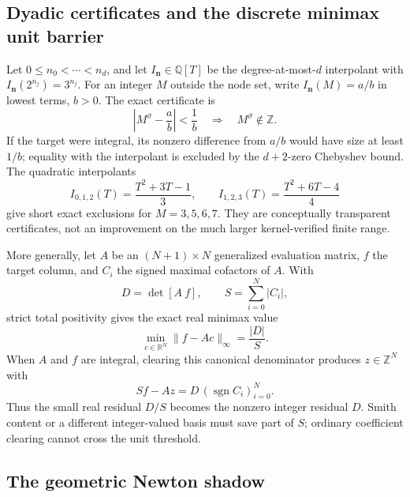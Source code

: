 \documentclass[11pt,oneside]{article}
\theoremstyle{definition}
\theoremstyle{remark}
\newcommand{\Z}{\mathbb Z}
\newcommand{\Q}{\mathbb Q}
\newcommand{\R}{\mathbb R}
\newcommand{\thetaq}{\vartheta}
\begin{document}
\subsection{Dyadic certificates and the discrete minimax unit barrier}
\label{arithinterp:certificates}

Let $0\le n_0<\cdots<n_d$, and let $I_{\mathbf n}\in\Q[T]$ be the degree-at-most-$d$
interpolant with $I_{\mathbf n}(2^{n_j})=3^{n_j}$.  For an integer $M$ outside the node set,
write $I_{\mathbf n}(M)=a/b$ in lowest terms, $b>0$.  The exact certificate is
\begin{equation}
 \left|M^{\thetaq}-\frac ab\right|<\frac1b
 \quad\Longrightarrow\quad M^{\thetaq}\notin\Z.
 \label{arithinterp:eq-dyadic-certificate}
\end{equation}
If the target were integral, its nonzero difference from $a/b$ would have size at least
$1/b$; equality with the interpolant is excluded by the $d+2$-zero Chebyshev bound.  The
quadratic interpolants
\begin{equation}
 I_{0,1,2}(T)=\frac{T^2+3T-1}{3},\qquad
 I_{1,2,3}(T)=\frac{T^2+6T-4}{4}
\end{equation}
give short exact exclusions for $M=3,5,6,7$.  They are conceptually transparent certificates,
not an improvement on the much larger kernel-verified finite range.

More generally, let $A$ be an $(N+1)\times N$ generalized evaluation matrix, $f$ the target
column, and $C_i$ the signed maximal cofactors of $A$.  With
\begin{equation}
 D=\det[A\ f],\qquad S=\sum_{i=0}^N|C_i|,
\end{equation}
strict total positivity gives the exact real minimax value
\begin{equation}
 \min_{c\in\R^N}\|f-Ac\|_\infty=\frac{|D|}{S}.
 \label{arithinterp:eq-minimax}
\end{equation}
When $A$ and $f$ are integral, clearing this canonical denominator produces $z\in\Z^N$ with
\begin{equation}
 Sf-Az=D\,(\operatorname{sgn}C_i)_{i=0}^N.
 \label{arithinterp:eq-arithmetic-alternant}
\end{equation}
Thus the small real residual $D/S$ becomes the nonzero integer residual $D$.  Smith content
or a different integer-valued basis must save part of $S$; ordinary coefficient clearing
cannot cross the unit threshold.

\subsection{The geometric Newton shadow}
\label{arithinterp:qnewton}
\end{document}
